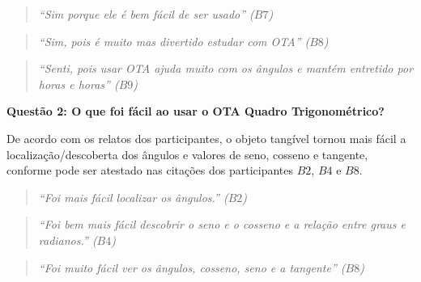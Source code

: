 \begin{quote}
	\textit{``Sim porque ele é bem fácil de ser usado'' ($B7$)}
\end{quote}

\begin{quote}
	\textit{``Sim, pois é muito mas divertido estudar com OTA'' ($B8$)}
\end{quote}

\begin{quote}
	\textit{``Senti, pois usar OTA ajuda muito com os ângulos e mantém entretido por horas e horas'' ($B9$)}
\end{quote}



\textbf{Questão 2: O que foi fácil ao usar o OTA Quadro Trigonométrico?}

De acordo com os relatos dos participantes, o objeto tangível tornou mais fácil a localização/descoberta dos ângulos e valores de seno, cosseno e tangente, conforme pode ser atestado nas citações dos participantes $B2$, $B4$ e $B8$.

\begin{quote}
	\textit{``Foi mais fácil localizar os ângulos.'' ($B2$)}
\end{quote}

\begin{quote}
	\textit{``Foi bem mais fácil descobrir o seno e o cosseno e a relação entre graus e radianos.'' ($B4$)}
\end{quote}

\begin{quote}
	\textit{``Foi muito fácil ver os ângulos, cosseno, seno e a tangente'' ($B8$)}
\end{quote}



